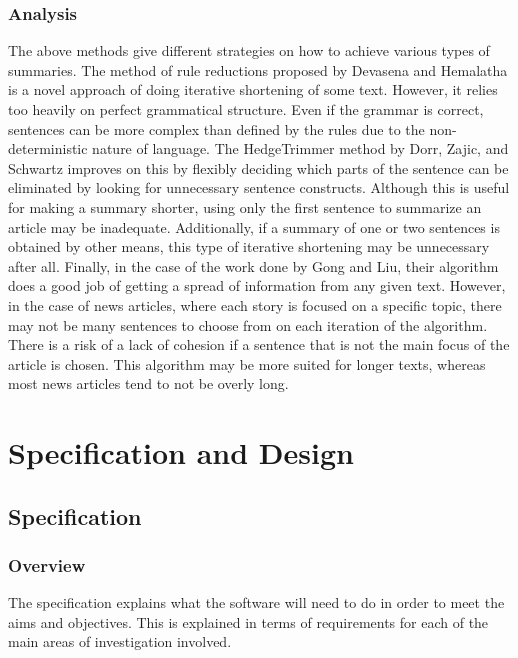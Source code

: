 \documentclass[11pt,titlepage]{report}
\begin{document}
\subsection{Analysis}
The above methods give different strategies on how to achieve various types of summaries. The method of rule reductions proposed by Devasena and Hemalatha is a novel approach of doing iterative shortening of some text. However, it relies too heavily on perfect grammatical structure. Even if the grammar is correct, sentences can be more complex than defined by the rules due to the non-deterministic nature of language. The HedgeTrimmer method by Dorr, Zajic, and Schwartz improves on this by flexibly deciding which parts of the sentence can be eliminated by looking for unnecessary sentence constructs. Although this is useful for making a summary shorter, using only the first sentence to summarize an article may be inadequate. Additionally, if a summary of one or two sentences is obtained by other means, this type of iterative shortening may be unnecessary after all. Finally, in the case of the work done by Gong and Liu, their algorithm does a good job of getting a spread of information from any given text. However, in the case of news articles, where each story is focused on a specific topic, there may not be many sentences to choose from on each iteration of the algorithm. There is a risk of a lack of cohesion if a sentence that is not the main focus of the article is chosen. This algorithm may be more suited for longer texts, whereas most news articles tend to not be overly long. 


\chapter{Specification and Design}
\section{Specification}
\subsection{Overview}
The specification explains what the software will need to do in order to meet the aims and objectives. This is explained in terms of requirements for each of the main areas of investigation involved. 
\end{document}

